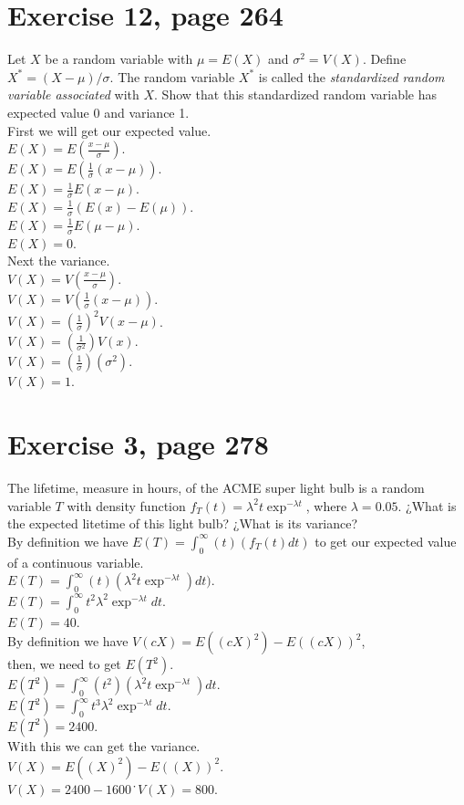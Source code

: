 \documentclass[]{article}
\begin{document}
\section{Exercise 12, page 264}
Let $X$ be a random variable with $\mu = E(X)$ and $\sigma^{2} = V(X)$. Define $X^{*} = (X- \mu)/\sigma$. The random variable $X^{*}$ is called the \textit{standardized random variable associated} with $X$. Show that this standardized random variable has expected value 0 and variance 1.\\
First we will get our expected value.\\
$E(X) = E(\frac{x-\mu}{\sigma})$.\\
$E(X) = E(\frac{1}{\sigma}(x-\mu))$.\\
$E(X) = \frac{1}{\sigma}E(x-\mu)$.\\
$E(X) = \frac{1}{\sigma}(E(x)-E(\mu))$.\\
$E(X) = \frac{1}{\sigma}E(\mu-\mu)$.\\
$E(X) = 0$.\\
Next the variance.\\
$V(X)= V(\frac{x-\mu}{\sigma})$.\\
$V(X)= V(\frac{1}{\sigma}(x-\mu))$.\\
$V(X)= (\frac{1}{\sigma})^{2} V(x - \mu)$.\\
$V(X)= (\frac{1}{\sigma^{2}}) V(x)$.\\
$V(X)= (\frac{1}{\sigma})(\sigma^{2})$.\\
$V(X)= 1$.\\




\section{Exercise 3, page 278}
The lifetime, measure in hours, of the ACME super light bulb is a random variable $T$ with density function $f_{T}(t) = \lambda ^{2}t\exp^{-\lambda t}$, where $ \lambda = 0.05$. ¿What is the expected litetime of this light bulb? ¿What is its variance?\\
By definition we have $E(T) = \int_{0}^{\infty}(t)(f_{T}(t)dt)$ to get our expected value of a continuous variable.\\
$E(T) = \int_{0}^{\infty}(t)(\lambda ^{2}t\exp^{-\lambda t})dt)$.\\
$E(T) = \int_{0}^{\infty}t^{2}\lambda ^{2}\exp^{-\lambda t}dt$.\\
$E(T) = 40$.\\
By definition we have $V(cX) = E((cX)^{2})-E((cX))^{2}$,\\
then, we need to get $E(T^{2})$.\\
$E(T^{2}) = \int_{0}^{\infty}(t^{2})(\lambda ^{2}t\exp^{-\lambda t})dt$.\\
$E(T^{2}) = \int_{0}^{\infty}t^{3}\lambda ^{2}\exp^{-\lambda t}dt$.\\
$E(T^{2}) = 2400$.\\
With this we can get the variance.\\
$V(X) = E((X)^{2})-E((X))^{2}$.\\
$V(X) = 2400 - 1600$\.\
$V(X) = 800$.\\
\end{document}

